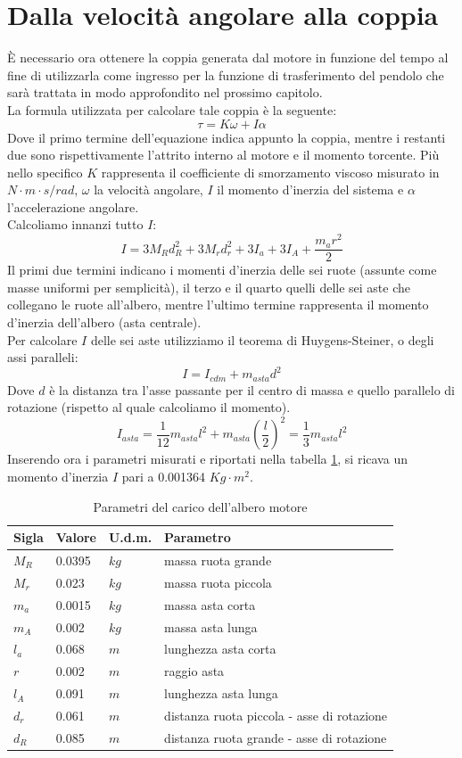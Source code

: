 \section{Dalla velocità angolare alla coppia}
È necessario ora ottenere la coppia generata dal motore in funzione del tempo al fine di utilizzarla come ingresso per la funzione di trasferimento del pendolo che sarà trattata in modo approfondito nel prossimo capitolo.\\
La formula utilizzata per calcolare tale coppia è la seguente:
$$
\tau=K\omega+I\alpha
$$
Dove il primo termine dell'equazione indica appunto la coppia, mentre i restanti due sono rispettivamente l'attrito interno al motore e il momento torcente.
Più nello specifico $K$ rappresenta il coefficiente di smorzamento viscoso misurato in $N\cdot m\cdot s/rad$, $\omega$ la velocità angolare, $I$ il momento d'inerzia del sistema e $\alpha$ l'accelerazione angolare.\\
Calcoliamo innanzi tutto $I$: 
$$
I=3M_Rd_R^2+3M_rd_r^2+3I_a+3I_A+\displaystyle\frac{m_ar^2}{2}
$$
Il primi due termini indicano i momenti d'inerzia delle sei ruote (assunte come masse uniformi per semplicità), il terzo e il quarto quelli delle sei aste che collegano le ruote all'albero, mentre l'ultimo termine rappresenta il momento d'inerzia dell'albero (asta centrale).\\
Per calcolare $I$ delle sei aste utilizziamo il teorema di Huygens-Steiner, o degli assi paralleli:
$$
I=I_{cdm}+m_{asta}d^2
$$
Dove $d$ è la distanza tra l'asse passante per il centro di massa e quello parallelo di rotazione (rispetto al quale calcoliamo il momento).\\
$$
I_{asta}=\displaystyle\frac{1}{12}m_{asta}l^2+m_{asta}(\displaystyle\frac{l}{2})^2=\displaystyle\frac{1}{3}m_{asta}l^2
$$
Inserendo ora i parametri misurati  e riportati nella tabella \ref{Inerzia}, si ricava un momento d'inerzia $I$ pari a 0.001364 $Kg\cdot m^2$.
\begin{table}[ht]
	\begin{tabular}{|l|l|l|l|}
		\hline
		\textbf{Sigla} & \textbf{Valore} & \textbf{U.d.m.} & \textbf{Parametro}\\
		\hline
		$M_R$ & 0.0395 & $kg$ & massa ruota grande\\
		\hline
		$M_r$ & 0.023 & $kg$ & massa ruota piccola\\
		\hline
		$m_a$ & 0.0015 & $kg$ & massa asta corta\\	
		\hline
		$m_A$ & 0.002 & $kg$ & massa asta lunga\\	
		\hline
		$l_a$ & 0.068 & $m$ & lunghezza asta corta\\
		\hline
		$r$ & 0.002 & $m$ & raggio asta\\
		\hline
		$l_A$ & 0.091 & $m$ & lunghezza asta lunga\\
		\hline
		$d_r$ & 0.061 & $m$ & distanza ruota piccola - asse di rotazione\\
		\hline
		$d_R$ & 0.085 & $m$  & distanza ruota grande - asse di rotazione\\
		\hline
	\end{tabular}
\caption{Parametri del carico dell'albero motore}
\label{Inerzia}
\end{table}
